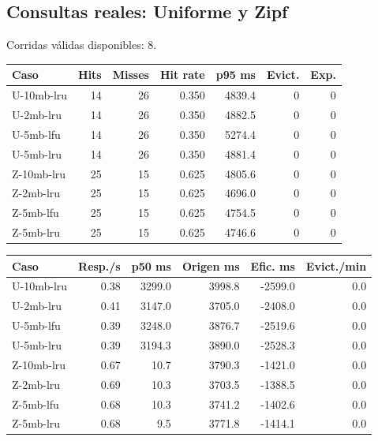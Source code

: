 \documentclass[11pt]{article}
\begin{document}
\subsection{Consultas reales: Uniforme y Zipf}
Corridas válidas disponibles: 8.\par
{\small\begin{longtable}{lrrrrrr}\toprule Caso & Hits & Misses & Hit rate & p95 ms & Evict. & Exp.\\\midrule\endhead
U-10mb-lru & 14 & 26 & 0.350 & 4839.4 & 0 & 0 \\
U-2mb-lru & 14 & 26 & 0.350 & 4882.5 & 0 & 0 \\
U-5mb-lfu & 14 & 26 & 0.350 & 5274.4 & 0 & 0 \\
U-5mb-lru & 14 & 26 & 0.350 & 4881.4 & 0 & 0 \\
Z-10mb-lru & 25 & 15 & 0.625 & 4805.6 & 0 & 0 \\
Z-2mb-lru & 25 & 15 & 0.625 & 4696.0 & 0 & 0 \\
Z-5mb-lfu & 25 & 15 & 0.625 & 4754.5 & 0 & 0 \\
Z-5mb-lru & 25 & 15 & 0.625 & 4746.6 & 0 & 0 \\
\bottomrule\end{longtable}}
{\small\begin{longtable}{lrrrrr}\toprule Caso & Resp./s & p50 ms & Origen ms & Efic. ms & Evict./min\\\midrule\endhead
U-10mb-lru & 0.38 & 3299.0 & 3998.8 & -2599.0 & 0.0 \\
U-2mb-lru & 0.41 & 3147.0 & 3705.0 & -2408.0 & 0.0 \\
U-5mb-lfu & 0.39 & 3248.0 & 3876.7 & -2519.6 & 0.0 \\
U-5mb-lru & 0.39 & 3194.3 & 3890.0 & -2528.3 & 0.0 \\
Z-10mb-lru & 0.67 & 10.7 & 3790.3 & -1421.0 & 0.0 \\
Z-2mb-lru & 0.69 & 10.3 & 3703.5 & -1388.5 & 0.0 \\
Z-5mb-lfu & 0.68 & 10.3 & 3741.2 & -1402.6 & 0.0 \\
Z-5mb-lru & 0.68 & 9.5 & 3771.8 & -1414.1 & 0.0 \\
\bottomrule\end{longtable}}
\end{document}
